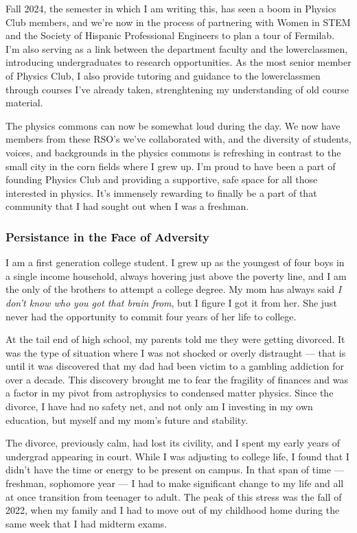 \documentclass[11pt]{article}
\begin{document}
Fall 2024, the semester in which I am writing this, has seen a boom in Physics Club members, and we're now in the process of partnering with Women in STEM and the Society of Hispanic Professional Engineers to plan a tour of Fermilab. I'm also serving as a link between the department faculty and the lowerclassmen, introducing undergraduates to research opportunities. As the most senior member of Physics Club, I also provide tutoring and guidance to the lowerclassmen through courses I've already taken, strenghtening my understanding of old course material.

The physics commons can now be somewhat loud during the day. We now have members from these RSO's we've collaborated with, and the diversity of students, voices, and backgrounds in the physics commons is refreshing in contrast to the small city in the corn fields where I grew up. I'm proud to have been a part of founding Physics Club and providing a supportive, safe space for all those interested in physics. It's immensely rewarding to finally be a part of that community that I had sought out when I was a freshman.
\subsubsection*{Persistance in the Face of Adversity}
I am a first generation college student. I grew up as the youngest of four boys in a single income household, always hovering just above the poverty line, and I am the only of the brothers to attempt a college degree. My mom has always said \textit{I don't know who you got that brain from}, but I figure I got it from her. She just never had the opportunity to commit four years of her life to college.

At the tail end of high school, my parents told me they were getting divorced. It was the type of situation where I was not shocked or overly distraught --- that is until it was discovered that my dad had been victim to a gambling addiction for over a decade. This discovery brought me to fear the fragility of finances and was a factor in my pivot from astrophysics to condensed matter physics. Since the divorce, I have had no safety net, and not only am I investing in my own education, but myself and my mom's future and stability.

The divorce, previously calm, had lost its civility, and I spent my early years of undergrad appearing in court. While I was adjusting to college life, I found that I didn't have the time or energy to be present on campus. In that span of time --- freshman, sophomore year --- I had to make significant change to my life and all at once transition from teenager to adult. The peak of this stress was the fall of 2022, when my family and I had to move out of my childhood home during the same week that I had midterm exams.
\end{document}
